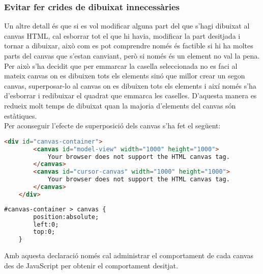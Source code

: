 \subsubsection{Evitar fer crides de dibuixat innecessàries}
Un altre detall és que si es vol modificar alguna part del que s'hagi dibuixat al canvas HTML, cal esborrar tot el que hi havia, modificar la part desitjada i tornar a dibuixar, això com es pot comprendre només és factible si hi ha moltes parts del canvas que s'estan canviant, però si només és un element no val la pena. Per això s'ha decidit que per emmarcar la casella seleccionada no es faci al mateix canvas on es dibuixen tots els elements sinó que millor crear un segon canvas, superposar-lo al canvas on es dibuixen tots els elements i així només s'ha d'esborrar i redibuixar el quadrat que emmarca les caselles. D'aquesta manera es redueix molt temps de dibuixat quan la majoria d'elements del canvas són estàtiques.\\

Per aconseguir l'efecte de superposició dels canvas s'ha fet el següent:

\begin{lstlisting}[language=html, caption=Declaració dels canvas]
    <div id="canvas-container">
        <canvas id="model-view" width="1000" height="1000">
            Your browser does not support the HTML canvas tag.
        </canvas>
        <canvas id="cursor-canvas" width="1000" height="1000">
            Your browser does not support the HTML canvas tag.
        </canvas>
    </div>
\end{lstlisting}

\begin{lstlisting}[language=html, caption=Estil dels canvas]
    #canvas-container > canvas {
        position:absolute;
        left:0;
        top:0;
    }
\end{lstlisting}

Amb aquesta declaració només cal administrar el comportament de cada canvas des de JavaScript per obtenir el comportament desitjat.








